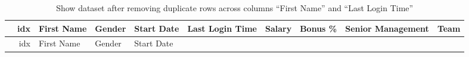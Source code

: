 \documentclass [oneside,10pt,a4paper,ngerman,BCOR10mm,headsepline,parindent,final]{scrartcl}
\begin{document}
    \begin{longtable}[]{@{}rrllllrrll@{}}
\caption{Show dataset after removing duplicate rows across columns
``First Name'' and ``Last Login Time''}\tabularnewline
\toprule
\begin{minipage}[b]{0.03\columnwidth}\raggedleft
\strut
\end{minipage} & \begin{minipage}[b]{0.04\columnwidth}\raggedleft
idx\strut
\end{minipage} & \begin{minipage}[b]{0.08\columnwidth}\raggedright
First Name\strut
\end{minipage} & \begin{minipage}[b]{0.06\columnwidth}\raggedright
Gender\strut
\end{minipage} & \begin{minipage}[b]{0.08\columnwidth}\raggedright
Start Date\strut
\end{minipage} & \begin{minipage}[b]{0.10\columnwidth}\raggedright
Last Login Time\strut
\end{minipage} & \begin{minipage}[b]{0.05\columnwidth}\raggedleft
Salary\strut
\end{minipage} & \begin{minipage}[b]{0.06\columnwidth}\raggedleft
Bonus \%\strut
\end{minipage} & \begin{minipage}[b]{0.11\columnwidth}\raggedright
Senior Management\strut
\end{minipage} & \begin{minipage}[b]{0.12\columnwidth}\raggedright
Team\strut
\end{minipage}\tabularnewline
\midrule
\endfirsthead
\toprule
\begin{minipage}[b]{0.03\columnwidth}\raggedleft
\strut
\end{minipage} & \begin{minipage}[b]{0.04\columnwidth}\raggedleft
idx\strut
\end{minipage} & \begin{minipage}[b]{0.08\columnwidth}\raggedright
First Name\strut
\end{minipage} & \begin{minipage}[b]{0.06\columnwidth}\raggedright
Gender\strut
\end{minipage} & \begin{minipage}[b]{0.08\columnwidth}\raggedright
Start Date\strut

\end{minipage}
\end{longtable}
\end{document}
